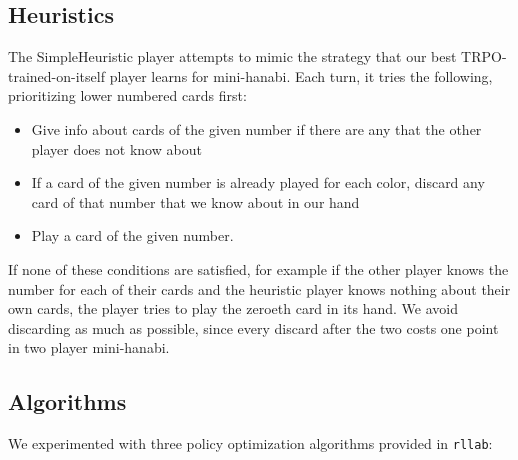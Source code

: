 \subsection{Heuristics}

The SimpleHeuristic player attempts to mimic the strategy that our best
TRPO-trained-on-itself player learns for mini-hanabi. Each turn, it tries the
following, prioritizing lower numbered cards first:

\begin{itemize}
\item Give info about cards of the given number if there are any that the other player does not know about
\item If a card of the given number is already played for each color, discard any card of that number that we know about in our hand
\item Play a card of the given number.
\end{itemize}

If none of these conditions are satisfied, for example if the other player
knows the number for each of their cards and the heuristic player knows
nothing about their own cards, the player tries to play the zeroeth card in
its hand. We avoid discarding as much as possible, since every discard after
the two costs one point in two player mini-hanabi.




\subsection{Algorithms}
We experimented with three policy optimization algorithms provided in
\texttt{rllab}:

